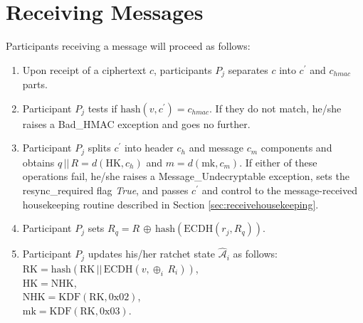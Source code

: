 \documentclass[%
preprint,
amsmath,amssymb,
aps,
prb,
floatfix,
]{revtex4-1}
\begin{document}
\section{\label{sec:receiving}Receiving Messages}
Participants receiving a message will proceed as follows:
\begin{enumerate}
\item Upon receipt of a ciphertext $c$, participants $P_j$ separates $c$ into
$c^\prime$ and $c_{hmac}$ parts.
\item Participant $P_j$ tests if $\mathrm{hash}(v, c^\prime) = c_{hmac}$. If
they do not match, he/she raises a Bad\_HMAC exception and goes no further.
\item Participant $P_j$ splits $c^\prime$ into header $c_h$ and message $c_m$ components
and obtains $q \, || \, R = d(\mathrm{HK}, c_h)$ and $m = d(\mathrm{mk},
c_m)$. If either of these operations fail, he/she raises a Message\_Undecryptable
exception, sets the resync\_required flag \textit{True},
and passes $c^\prime$ and control to the message-received housekeeping routine described in
Section \ref{sec:receivehousekeeping}.
\item Participant $P_j$ sets $R_q = R \, \oplus \,
\mathrm{hash}(\mathrm{ECDH}(r_j, R_q))$.
\item Participant $P_j$ updates his/her ratchet state $\mathcal{\hat{A}}_i$ as
follows: \\
$\mathrm{RK} = \mathrm{hash}(\mathrm{RK} \, || \, \mathrm{ECDH}(v, \oplus_i
\, R_i))$, \\
$\mathrm{HK} = \mathrm{NHK}$, \\
$\mathrm{NHK} = \mathrm{KDF}(\mathrm{RK}, 0\mathrm{x}02)$, \\
$\mathrm{mk} = \mathrm{KDF}(\mathrm{RK}, 0\mathrm{x}03)$.

\end{enumerate}
\end{document}
